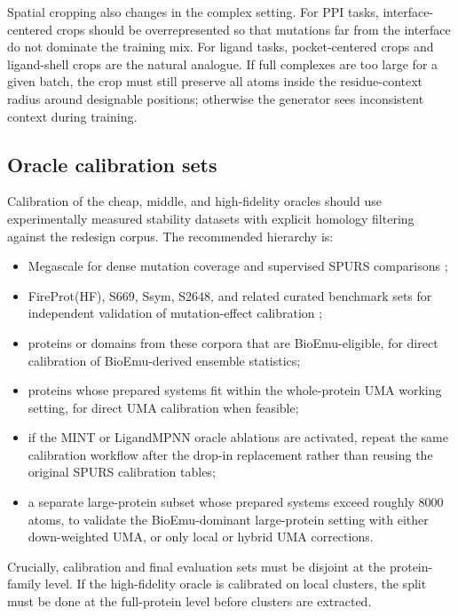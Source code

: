 \documentclass[11pt]{article}
\begin{document}
Spatial cropping also changes in the complex setting. For PPI tasks, interface-centered crops should be overrepresented so that mutations far from the interface do not dominate the training mix. For ligand tasks, pocket-centered crops and ligand-shell crops are the natural analogue. If full complexes are too large for a given batch, the crop must still preserve all atoms inside the residue-context radius around designable positions; otherwise the generator sees inconsistent context during training.


\subsection{Oracle calibration sets}

Calibration of the cheap, middle, and high-fidelity oracles should use experimentally measured stability datasets with explicit homology filtering against the redesign corpus. The recommended hierarchy is:
\begin{itemize}[leftmargin=1.5em]
    \item Megascale for dense mutation coverage and supervised SPURS comparisons \citep{tsuboyama2023megascale,li2026spurs};
    \item FireProt(HF), S669, Ssym, S2648, and related curated benchmark sets for independent validation of mutation-effect calibration \citep{stourac2021fireprotdb,pancotti2022s669,dieckhaus2024thermompnn};
    \item proteins or domains from these corpora that are BioEmu-eligible, for direct calibration of BioEmu-derived ensemble statistics;
    \item proteins whose prepared systems fit within the whole-protein UMA working setting, for direct UMA calibration when feasible;
    \item if the MINT or LigandMPNN oracle ablations are activated, repeat the same calibration workflow after the drop-in replacement rather than reusing the original SPURS calibration tables;
    \item a separate large-protein subset whose prepared systems exceed roughly $8000$ atoms, to validate the BioEmu-dominant large-protein setting with either down-weighted UMA, or only local or hybrid UMA corrections.
\end{itemize}
Crucially, calibration and final evaluation sets must be disjoint at the protein-family level. If the high-fidelity oracle is calibrated on local clusters, the split must be done at the full-protein level before clusters are extracted.
\end{document}

